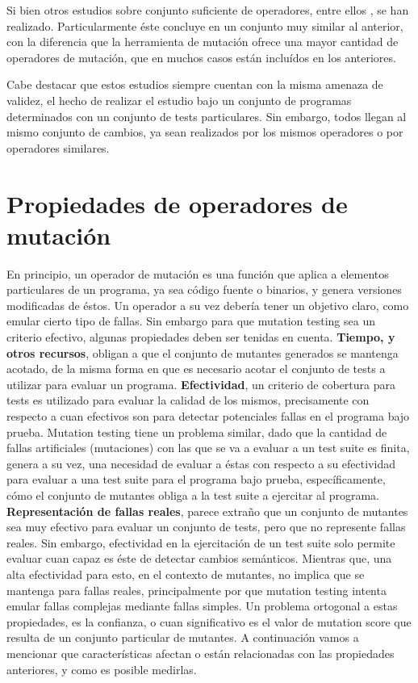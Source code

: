 Si bien otros estudios sobre conjunto suficiente de operadores, entre ellos \cite{bibliography.mutation.selection.ASN2008}, se han realizado. Particularmente \'este concluye en un conjunto muy similar al anterior, con la diferencia que la herramienta de mutaci\'on ofrece una mayor cantidad de operadores de mutaci\'on, que en muchos casos est\'an inclu\'idos en los anteriores.

Cabe destacar que estos estudios siempre cuentan con la misma amenaza de validez, el hecho de realizar el estudio bajo un conjunto de programas determinados con un conjunto de tests particulares. Sin embargo, todos llegan al mismo conjunto de cambios, ya sean realizados por los mismos operadores o por operadores similares.

\section{Propiedades de operadores de mutaci\'on}
\label{sec:preliminares.mutation.opevaluation}

En principio, un operador de mutaci\'on es una funci\'on que aplica a elementos particulares de un programa, ya sea c\'odigo fuente o binarios, y genera versiones modificadas de \'estos. Un operador a su vez deber\'ia tener un objetivo claro, como emular cierto tipo de fallas. Sin embargo para que mutation testing sea un criterio efectivo, algunas propiedades deben ser tenidas en cuenta. \textbf{Tiempo, y otros recursos}, obligan a que el conjunto de mutantes generados se mantenga acotado, de la misma forma en que es necesario acotar el conjunto de tests a utilizar para evaluar un programa. \textbf{Efectividad}, un criterio de cobertura para tests es utilizado para evaluar la calidad de los mismos, precisamente con respecto a cuan efectivos son para detectar potenciales fallas en el programa bajo prueba. Mutation testing tiene un problema similar, dado que la cantidad de fallas artificiales (mutaciones) con las que se va a evaluar a un test suite es finita, genera a su vez, una necesidad de evaluar a \'estas con respecto a su efectividad para evaluar a una test suite para el programa bajo prueba, espec\'ificamente, c\'omo el conjunto de mutantes obliga a la test suite a ejercitar al programa. \textbf{Representaci\'on de fallas reales}, parece extra\~no que un conjunto de mutantes sea muy efectivo para evaluar un conjunto de tests, pero que no represente fallas reales. Sin embargo, efectividad en la ejercitaci\'on de un test suite solo permite evaluar cuan capaz es \'este de detectar cambios sem\'anticos. Mientras que, una alta efectividad para esto, en el contexto de mutantes, no implica que se mantenga para fallas reales, principalmente por que mutation testing intenta emular fallas complejas mediante fallas simples. Un problema ortogonal a estas propiedades, es la confianza, o cuan significativo es el valor de mutation score que resulta de un conjunto particular de mutantes. A continuaci\'on vamos a mencionar que caracter\'isticas afectan o est\'an relacionadas con las propiedades anteriores, y como es posible medirlas.

